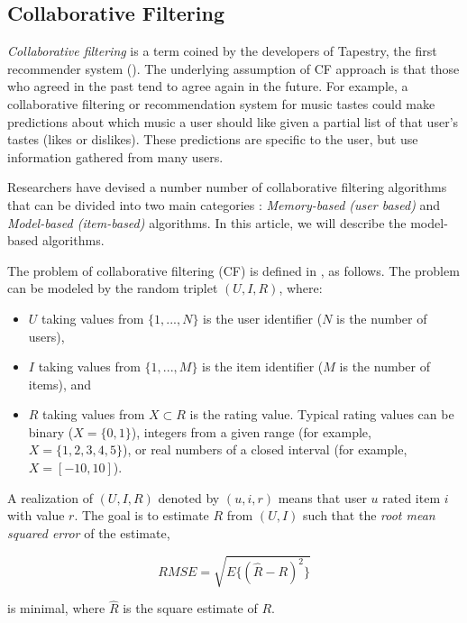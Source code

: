 \documentclass[11pt]{amsart}
\begin{document}
\subsection{Collaborative Filtering}
\label{sec:cf}

\emph{Collaborative filtering} is a term coined by the developers of Tapestry, the first recommender system (\cite{Goldberg92usingcollaborative}). The underlying assumption of CF approach is that those who agreed in the past tend to agree again in the future. For example, a collaborative filtering or recommendation system for music tastes could make predictions about which music a user should like given a partial list of that user's tastes (likes or dislikes). These predictions are specific to the user, but use information gathered from many users. 

Researchers have devised a number number of collaborative filtering algorithms that can be divided into two main categories 
\cite{Sarwar01item-basedcollaborative}: \emph{Memory-based (user based)} and \emph{Model-based (item-based)} algorithms. In this article, we will describe the model-based algorithms.

The problem of collaborative filtering (CF) is defined in \cite{takacs09scalable}, as follows. The problem can be modeled by the random triplet $(U,I,R)$, where:
  \begin{itemize}
    \item $U$ taking values from $\{1,...,N\}$ is the user identifier ($N$ is the number of users),
    \item $I$ taking values from $\{1,...,M\}$ is the item identifier ($M$ is the number of items), and
    \item $R$ taking values from $X \subset R$ is the rating value. Typical rating values can be binary ($X = \{0,1\}$), integers from a given range (for example, $X = \{1,2,3,4,5\}$), or real numbers of a closed interval (for example, $X = [−10, 10]$).
  \end{itemize}

A realization of $(U,I,R)$ denoted by $(u,i,r)$ means that user $u$ rated item $i$ with value $r$. The goal is to estimate $R$ from $(U,I)$ such that the \emph{root mean squared error} of the estimate,

\begin{equation}
  \label{rmse_1}
  RMSE = \sqrt{E\{(\hat{R}-R)^2\}}
\end{equation}

is minimal, where $\hat{R}$ is the square estimate of $R$.
\end{document}
